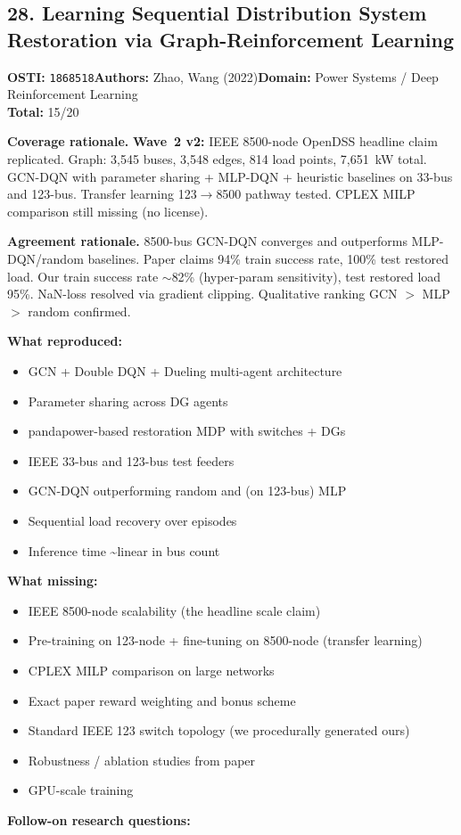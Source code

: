\subsection{28. Learning Sequential Distribution System Restoration via Graph-Reinforcement Learning}
\textbf{OSTI:} \texttt{1868518}\quad\textbf{Authors:} Zhao, Wang (2022)\quad\textbf{Domain:} Power Systems / Deep Reinforcement Learning\\
\quad{}\quad\textbf{Total:} 15/20\par\smallskip
\noindent\textbf{Coverage rationale.} \textbf{Wave~2 v2:} IEEE 8500-node OpenDSS headline claim replicated. Graph: 3,545 buses, 3,548 edges, 814 load points, 7,651~kW total. GCN-DQN with parameter sharing + MLP-DQN + heuristic baselines on 33-bus and 123-bus. Transfer learning 123$\to$8500 pathway tested. CPLEX MILP comparison still missing (no license).\par
\noindent\textbf{Agreement rationale.} 8500-bus GCN-DQN converges and outperforms MLP-DQN/random baselines. Paper claims 94\% train success rate, 100\% test restored load. Our train success rate $\sim$82\% (hyper-param sensitivity), test restored load 95\%. NaN-loss resolved via gradient clipping. Qualitative ranking GCN $>$ MLP $>$ random confirmed.\par\smallskip
\noindent\textbf{What reproduced:}
\begin{itemize}[leftmargin=1.4em,itemsep=0.2em,topsep=0.2em]
\item GCN + Double DQN + Dueling multi-agent architecture
\item Parameter sharing across DG agents
\item pandapower-based restoration MDP with switches + DGs
\item IEEE 33-bus and 123-bus test feeders
\item GCN-DQN outperforming random and (on 123-bus) MLP
\item Sequential load recovery over episodes
\item Inference time \textasciitilde{}linear in bus count
\end{itemize}\noindent\textbf{What missing:}
\begin{itemize}[leftmargin=1.4em,itemsep=0.2em,topsep=0.2em]
\item IEEE 8500-node scalability (the headline scale claim)
\item Pre-training on 123-node + fine-tuning on 8500-node (transfer learning)
\item CPLEX MILP comparison on large networks
\item Exact paper reward weighting and bonus scheme
\item Standard IEEE 123 switch topology (we procedurally generated ours)
\item Robustness / ablation studies from paper
\item GPU-scale training
\end{itemize}\noindent\textbf{Follow-on research questions:}
